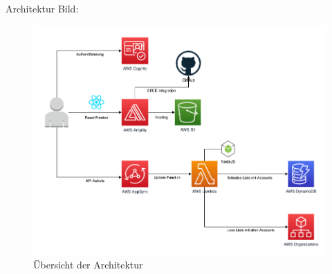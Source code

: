 Architektur Bild:

\begin{figure}[htbp]
    \centering
    \includegraphics[width=1.0\textwidth]{50-Implementierung/Architektur.png}
    \caption{Übersicht der Architektur}
    \label{fig:meine-grafik}
\end{figure}
